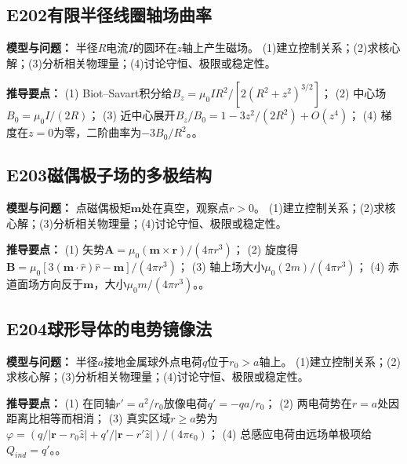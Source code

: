 \par\medskip

\subsection*{E202\quad 有限半径线圈轴场曲率}

\textbf{模型与问题：} 半径$R$电流$I$的圆环在$z$轴上产生磁场。 (1)建立控制关系；(2)求核心解；(3)分析相关物理量；(4)讨论守恒、极限或稳定性。

\par\textbf{推导要点：} (1) Biot–Savart积分给$B_z=\mu_0IR^2/[2(R^2+z^2)^{3/2}]$； (2) 中心场$B_0=\mu_0I/(2R)$； (3) 近中心展开$B_z/B_0=1-3z^2/(2R^2)+O(z^4)$； (4) 梯度在$z=0$为零，二阶曲率为$-3B_0/R^2$。。

\par\medskip

\subsection*{E203\quad 磁偶极子场的多极结构}

\textbf{模型与问题：} 点磁偶极矩$\mathbf m$处在真空，观察点$r>0$。 (1)建立控制关系；(2)求核心解；(3)分析相关物理量；(4)讨论守恒、极限或稳定性。

\par\textbf{推导要点：} (1) 矢势$\mathbf A=\mu_0(\mathbf m\times\mathbf r)/(4\pi r^3)$； (2) 旋度得$\mathbf B=\mu_0[3(\mathbf m\cdot\hat r)\hat r-\mathbf m]/(4\pi r^3)$； (3) 轴上场大小$\mu_0(2m)/(4\pi r^3)$； (4) 赤道面场方向反于$\mathbf m$，大小$\mu_0m/(4\pi r^3)$。。

\par\medskip

\subsection*{E204\quad 球形导体的电势镜像法}

\textbf{模型与问题：} 半径$a$接地金属球外点电荷$q$位于$r_0>a$轴上。 (1)建立控制关系；(2)求核心解；(3)分析相关物理量；(4)讨论守恒、极限或稳定性。

\par\textbf{推导要点：} (1) 在同轴$r'=a^2/r_0$放像电荷$q'=-qa/r_0$； (2) 两电荷势在$r=a$处因距离比相等而相消； (3) 真实区域$r\ge a$势为$\varphi=(q/|\mathbf r-r_0\hat z|+q'/|\mathbf r-r'\hat z|)/(4\pi\epsilon_0)$； (4) 总感应电荷由远场单极项给$Q_{ind}=q'$。。

\par\medskip

